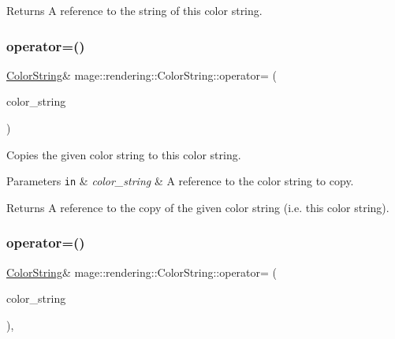 \begin{DoxyReturn}{Returns}
A reference to the string of this color string. 
\end{DoxyReturn}
\hypertarget{classmage_1_1rendering_1_1_color_string_ab42304d36628f21263a4d545831b3829}{}\label{classmage_1_1rendering_1_1_color_string_ab42304d36628f21263a4d545831b3829} 
\subsubsection{\texorpdfstring{operator=()}{operator=()}\hspace{0.1cm}{\footnotesize\ttfamily [1/2]}}
{\footnotesize\ttfamily \hyperlink{classmage_1_1rendering_1_1_color_string}{Color\+String}\& mage\+::rendering\+::\+Color\+String\+::operator= (\begin{DoxyParamCaption}\item[{const \hyperlink{classmage_1_1rendering_1_1_color_string}{Color\+String} \&}]{color\+\_\+string }\end{DoxyParamCaption})\hspace{0.3cm}{\ttfamily [default]}}

Copies the given color string to this color string.


\begin{DoxyParams}[1]{Parameters}
\mbox{\tt in}  & {\em color\+\_\+string} & A reference to the color string to copy. \\
\hline
\end{DoxyParams}
\begin{DoxyReturn}{Returns}
A reference to the copy of the given color string (i.\+e. this color string). 
\end{DoxyReturn}
\hypertarget{classmage_1_1rendering_1_1_color_string_aa70b60e0c8528306e7473ee0b5bfbe03}{}\label{classmage_1_1rendering_1_1_color_string_aa70b60e0c8528306e7473ee0b5bfbe03} 
\subsubsection{\texorpdfstring{operator=()}{operator=()}\hspace{0.1cm}{\footnotesize\ttfamily [2/2]}}
{\footnotesize\ttfamily \hyperlink{classmage_1_1rendering_1_1_color_string}{Color\+String}\& mage\+::rendering\+::\+Color\+String\+::operator= (\begin{DoxyParamCaption}\item[{\hyperlink{classmage_1_1rendering_1_1_color_string}{Color\+String} \&\&}]{color\+\_\+string }\end{DoxyParamCaption})\hspace{0.3cm}{\ttfamily [default]}, {\ttfamily [noexcept]}}

